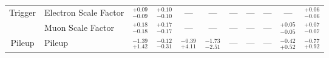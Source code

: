 \begin{tabular}{|cl||ccccccc|c||c|}
\hline
\multirow{2}{*}{Trigger}
&Electron Scale Factor &  $^{+0.09}_{-0.09}$  &  $^{+0.10}_{-0.10}$  & --- & --- & --- & --- & --- & --- &  $^{+0.06}_{-0.06}$ \\ 
\cline{2-11}
&Muon Scale Factor &  $^{+0.18}_{-0.18}$  &  $^{+0.17}_{-0.17}$  & --- & --- & --- & --- & --- &  $^{+0.05}_{-0.05}$  &  $^{+0.07}_{-0.07}$ \\ 
\hline
\multirow{1}{*}{Pileup}
&Pileup &  $^{-1.39}_{+1.42}$  &  $^{-0.12}_{-0.31}$  &  $^{-0.39}_{+4.11}$  &  $^{-1.73}_{-2.51}$  & --- & --- & --- &  $^{-0.42}_{+0.52}$  &  $^{-0.77}_{+0.92}$ \\ 
\hline
\end{tabular}
